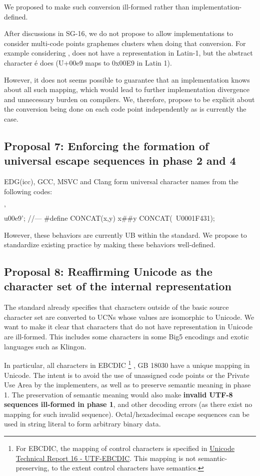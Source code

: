\documentclass{wg21}
\begin{document}
We proposed to make such conversion ill-formed rather than implementation-defined.

After discussions in SG-16, we do not propose to allow implementations to consider multi-code points graphemes clusters
when doing that conversion. For example considering ,  does not have a representation in Latin-1,
but the abstract character é does (U+00e9 maps to 0x00E9 in Latin 1).

However, it does not seems possible to guarantee that an implementation knows about all such mapping, which would lead to further implementation
divergence and unnecessary burden on compilers.
We, therefore, propose to be explicit about the conversion being done on each code point independently as is currently the case.

\subsection{Proposal 7: Enforcing the formation of universal escape sequences in phase 2 and 4}

EDG(icc), GCC, MSVC and Clang form universal character names from the following codes:
\begin{colorblock}
'\\
u00e9';
//---
#define CONCAT(x,y) x\#\#y
CONCAT(\, U0001F431);
\end{colorblock}

However, these behaviors are currently UB within the standard.
We propose to standardize existing practice by making these behaviors well-defined. 


\subsection{Proposal 8: Reaffirming Unicode as the character set of the internal representation}

The standard already specifies that characters outside of the basic source character set are converted to UCNs whose values are isomorphic to
Unicode.
We want to make it clear that characters that do not have representation in Unicode are ill-formed.
This includes some characters in some Big5 encodings and exotic languages such as Klingon.

In particular, all characters in EBCDIC
\footnote{For EBCDIC, the mapping of control characters is specified in \href{http://www.unicode.org/reports/tr16/tr16-8.html}{Unicode Technical Report 16 - UTF-EBCDIC}.
This mapping is not semantic-preserving, to the extent control characters have semantics.
}
, GB 18030 have a unique mapping in Unicode.
The intent is to avoid the use of unassigned code points or the Private Use Area by the implementers, as well as to preserve semantic meaning in phase 1.
The preservation of semantic meaning would also make \textbf{invalid UTF-8 sequences ill-formed in phase 1}, and other decoding errors (as there exist no mapping for such invalid sequence).
Octal/hexadecimal escape sequences can be used in string literal to form arbitrary binary data.
\end{document}
